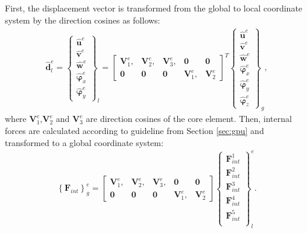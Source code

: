 First, the displacement vector is transformed from the global to local coordinate system by the direction cosines as follows:
\begin{eqnarray}
	\widehat{\textbf{d}}^e_l = \left \{\begin{array}{c}
		\widehat{\textbf{u}}^e \\ \widehat{\textbf{v}}^e \\
		\widehat{\textbf{w}}^e \\ \widehat{\boldsymbol{\varphi}}_x^e \\
		\widehat{\boldsymbol{\varphi}}_y^e
	\end{array}\right \}_l = 
	\left [\begin{array}{ccccc}
		\textbf{V}^e_1, & \textbf{V}^e_2, & \textbf{V}^e_3, & \textbf{0} & \textbf{0} \\
		\textbf{0} & \textbf{0} & \textbf{0} & \textbf{V}^e_1, & \textbf{V}^e_2
	\end{array}\right ]^T
	\left \{\begin{array}{c}
		\widehat{\textbf{u}}^e \\ \widehat{\textbf{v}}^e \\
		\widehat{\textbf{w}}^e \\ \widehat{\boldsymbol{\varphi}}_x^e \\
		\widehat{\boldsymbol{\varphi}}_y^e\\
		\widehat{\boldsymbol{\varphi}}_z^e
	\end{array}\right \}_g,
	\label{eq:d_local}
\end{eqnarray}
where \(\textbf{V}^e_1\),\(\textbf{V}^e_2\) and \(\textbf{V}^e_3\) are direction cosines of the core element. Then, internal forces are calculated according to guideline from Section \ref{sec:gpu} and transformed to a global coordinate system:
\begin{eqnarray}
	\left\{\textbf{F}_{int}\right\}^e_g =
	\left [\begin{array}{ccccc}
		\textbf{V}^e_1, & \textbf{V}^e_2, & \textbf{V}^e_3, & \textbf{0} & \textbf{0} \\
		\textbf{0} & \textbf{0} & \textbf{0} & \textbf{V}^e_1, & \textbf{V}^e_2
	\end{array}\right ]
	\left \{\begin{array}{c}
		\textbf{F}^1_{int} \\
		\textbf{F}^2_{int} \\
		\textbf{F}^3_{int} \\
		\textbf{F}^4_{int} \\
		\textbf{F}^5_{int} \\
	\end{array}\right \}_l^e.
	\label{eq:f_global}
\end{eqnarray}

